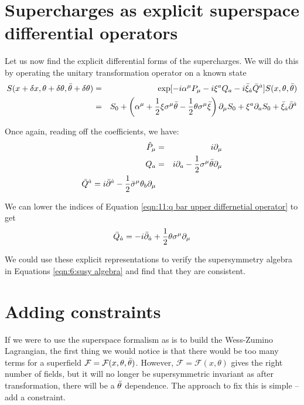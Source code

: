 \section{Supercharges as explicit superspace differential operators}
Let us now find the explicit differential forms of the supercharges. We will do this by operating the unitary transformation operator on a known state
\begin{eqnarray}
    S(x + \delta x, \theta + \delta \theta, \Bar{\theta} + \delta \theta) &=& \exp[-i \alpha^\mu P_\mu -i \xi^a Q_a - i \Bar{\xi}_{\Dot{a}}\Bar{Q}^{\Dot{a}}] S(x, \theta, \Bar{\theta}) \nonumber \\
    &=& S_0 + \left( \alpha^\mu + \frac{1}{2}\xi\sigma^\mu\Bar{\theta} -\frac{1}{2}\theta\sigma^\mu\Bar{\xi}\right) \partial_\mu S_0 + \xi^a\partial_a S_0 + \Bar{\xi}_{\Dot{a}}\Bar{\partial}^{\Dot{a}}
\end{eqnarray}

Once again, reading off the coefficients, we have:
\begin{eqnarray}
    \hat{P}_\mu &=& i\partial_\mu \label{eqn:11:p differential operator} \\
    Q_a &=& i \partial_a - \frac{1}{2} \sigma^\mu\Bar{\theta}\partial_\mu \label{eqn:11:q differential operator} \\
    \Bar{Q}^{\Dot{a}} = i \Bar{\partial}^{\Dot{a}} - \frac{1}{2} \Bar{\sigma}^\mu \theta_b \partial_\mu \label{eqn:11:q bar upper differnetial operator}
\end{eqnarray}

We can lower the indices of Equation \ref{eqn:11:q bar upper differnetial operator} to get
\begin{equation}
    \Bar{Q}_{\Dot{a}} = -i \Bar{\partial}_{\Dot{a}} + \frac{1}{2} \theta \sigma^\mu \partial_\mu
\end{equation}

We could use these explicit representations to verify the supersymmetry algebra in Equations \ref{eqn:6:susy algebra} and find that they are consistent.

\section{Adding constraints}
\label{ch:11:constraints}
If we were to use the superspace formalism as is to build the Wess-Zumino Lagrangian, the first thing we would notice is that there would be too many terms for a superfield $\mathcal{F} = \mathcal{F}(x, \theta, \Bar{\theta})$. However, $\mathcal{F} = \mathcal{F}(x, \theta)$ gives the right number of fields, but it will no longer be supersymmetric invariant as after transformation, there will be a $\Bar{\theta}$ dependence. The approach to fix this is simple -- add a constraint. 

